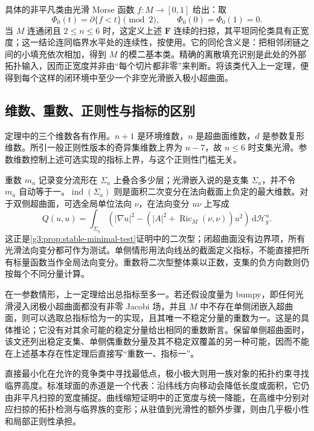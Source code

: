 \ProseParagraphBreak
具体的非平凡类由光滑 Morse 函数 \(f:M\to[0,1]\) 给出：取
\[
	\Phi_0(t)=\partial\{f<t\}\pmod2,\qquad \Phi_0(0)=\Phi_0(1)=0.
\]
当 \(M\) 连通闭且 \(2\le n\le6\) 时，这定义上述 \(\mathbf F\) 连续的扫掠，其平坦同伦类具有正宽度；这一结论连同临界水平处的连续性，按\cite[例3.2，第470页]{MarquesNeves2016IndexMultiplicity}使用。它的同伦含义是：把相邻闭链之间的小填充依次相加，得到 \(M\) 的模二基本类。精确的离散填充识别是此处的外部拓扑输入，因而正宽度并非由“每个切片都非零”来判断。将该类代入上一定理，便得到每个这样的闭环境中至少一个非空光滑嵌入极小超曲面。

\subsection{维数、重数、正则性与指标的区别}
\label{g3:subsec:2305:06}
定理中的三个维数各有作用。\(n+1\) 是环境维数，\(n\) 是超曲面维数，\(d\) 是参数复形维数。所引一般正则性版本的奇异集维数上界为 \(n-7\)，故 \(n\le6\) 时支集光滑。参数维数控制上述可选实现的指标上界，与这个正则性门槛无关。

\ProseParagraphBreak
重数 \(m_a\) 记录变分流形在 \(\Sigma_a\) 上叠合多少层；光滑嵌入说的是支集 \(\Sigma_a\)，并不令 \(m_a\) 自动等于一。\(\operatorname{ind}(\Sigma_a)\) 则是面积二次变分在法向截面上负定的最大维数。对于双侧超曲面，可选全局单位法向 \(\nu\)，在法向变分 \(u\nu\) 上写成
\[
	Q(u,u)=\int_{\Sigma_a}
	\left(|\nabla u|^2-(|A|^2+\operatorname{Ric}_M(\nu,\nu))u^2\right)
	\,\mathrm d\mathcal H_g^n.
\]
这正是\cref{g3:prop:stable-minimal-test}证明中的二次型；闭超曲面没有边界项，所有光滑法向变分都可作为测试。单侧情形用法向线丛的截面定义指标，不能直接把所有标量函数当作全局法向变分。重数将二次型整体乘以正数，支集的负方向数则仍按每个不同分量计算。

\ProseParagraphBreak
在一参数情形，上一定理给出总指标至多一。若还假设度量为 bumpy，即任何光滑浸入闭极小超曲面都没有非零 Jacobi 场，并且 \(M\) 中不存在单侧闭嵌入超曲面，则可以选取总指标恰为一的实现，且其唯一不稳定分量的重数为一。这是\cite[定理1.7及推论1.8，第467--468页]{MarquesNeves2016IndexMultiplicity}的具体推论；它没有对其余可能的稳定分量给出相同的重数断言。保留单侧超曲面时，该文还列出稳定支集、单侧偶重数分量及其不稳定双覆盖的另一种可能，因而不能在上述基本存在性定理后直接写“重数一、指标一”。

\ProseParagraphBreak
直接最小化在允许的竞争类中寻找最低点，极小极大则用一族对象的拓扑约束寻找临界高度。标准球面的赤道是一个代表：沿纬线方向移动会降低长度或面积，它仍由非平凡扫掠的宽度捕捉。曲线缩短证明中的正宽度与统一降能，在高维中分别对应扫掠的拓扑检测与临界族的变形；从驻值到光滑性的额外步骤，则由几乎极小性和局部正则性承担。

